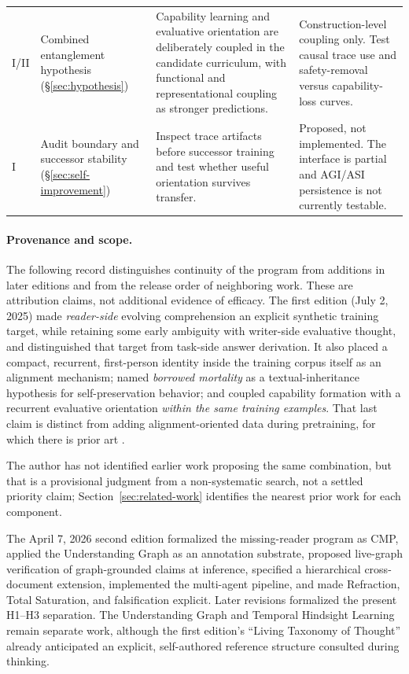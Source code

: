 \documentclass[11pt]{article}
\begin{document}
\begin{longtable}{
  >{\raggedright\arraybackslash}p{0.65cm}
  >{\raggedright\arraybackslash}p{3.35cm}
  >{\raggedright\arraybackslash}p{4.75cm}
  >{\raggedright\arraybackslash}p{4.75cm}}
\textsc{I/II} & Combined entanglement hypothesis (\S\ref{sec:hypothesis}) & Capability learning and evaluative orientation are deliberately coupled in the candidate curriculum, with functional and representational coupling as stronger predictions. & Construction-level coupling only. Test causal trace use and safety-removal versus capability-loss curves. \\
\textsc{I} & Audit boundary and successor stability (\S\ref{sec:self-improvement}) & Inspect trace artifacts before successor training and test whether useful orientation survives transfer. & Proposed, not implemented. The interface is partial and AGI/ASI persistence is not currently testable. \\
\end{longtable}
\endgroup

\paragraph{Provenance and scope.} The following record distinguishes continuity
of the program from additions in later editions and from the release order of
neighboring work. These are attribution claims, not additional evidence of
efficacy. The first edition (July 2, 2025) made
\emph{reader-side} evolving comprehension an explicit synthetic training
target, while retaining some early ambiguity with writer-side evaluative
thought, and distinguished that target from task-side answer derivation. It
also placed a compact, recurrent, first-person identity inside the training
corpus itself as an alignment mechanism; named \emph{borrowed mortality} as a
textual-inheritance hypothesis for self-preservation behavior; and coupled
capability formation with a recurrent evaluative orientation \emph{within the
same training examples}. That last claim is distinct from adding
alignment-oriented data during pretraining, for which there is prior art
\cite{korbak2023pretraining}.

The author has not identified earlier work proposing the same combination, but
that is a provisional judgment from a non-systematic search, not a settled
priority claim; Section~\ref{sec:related-work} identifies the nearest prior work
for each component.

The April 7, 2026 second edition formalized the missing-reader program as CMP,
applied the Understanding Graph as an annotation substrate, proposed live-graph
verification of graph-grounded claims at inference, specified a hierarchical
cross-document extension, implemented the multi-agent pipeline, and made
Refraction, Total Saturation, and falsification explicit. Later revisions
formalized the present H1--H3 separation. The Understanding Graph and Temporal
Hindsight Learning remain separate work, although the first edition's ``Living
Taxonomy of Thought'' already anticipated an explicit, self-authored reference
structure consulted during thinking.
\end{document}

